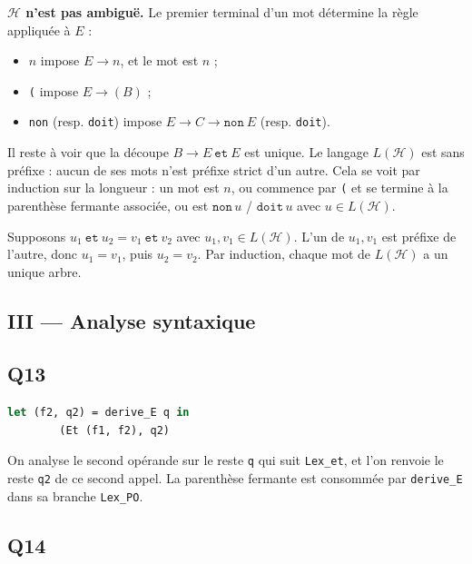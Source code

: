 \documentclass[11pt,a4paper]{article}
\providecommand{\tightlist}{\setlength{\itemsep}{0pt}\setlength{\parskip}{0pt}}
\begin{document}
\textbf{\(\mathcal H\) n'est pas ambiguë.} Le premier terminal d'un mot détermine la règle appliquée à \(E\) :

\begin{itemize}
\tightlist
\item
  \(n\) impose \(E\to n\), et le mot est \(n\) ;
\item
  \texttt{(} impose \(E\to(B)\) ;
\item
  \texttt{non} (resp. \texttt{doit}) impose \(E\to C\to\mathtt{non}\ E\) (resp. \texttt{doit}).
\end{itemize}

Il reste à voir que la découpe \(B\to E\ \mathtt{et}\ E\) est unique. Le langage \(L(\mathcal H)\) est sans préfixe : aucun de ses mots n'est préfixe strict d'un autre. Cela se voit par induction sur la longueur : un mot est \(n\), ou commence par \texttt{(} et se termine à la parenthèse fermante associée, ou est \(\mathtt{non}\,u\) / \(\mathtt{doit}\,u\) avec \(u\in L(\mathcal H)\).

Supposons \(u_1\ \mathtt{et}\ u_2 = v_1\ \mathtt{et}\ v_2\) avec \(u_1,v_1\in L(\mathcal H)\). L'un de \(u_1,v_1\) est préfixe de l'autre, donc \(u_1=v_1\), puis \(u_2=v_2\). Par induction, chaque mot de \(L(\mathcal H)\) a un unique arbre.

\hypertarget{iii-analyse-syntaxique}{%
\subsection{III --- Analyse syntaxique}\label{iii-analyse-syntaxique}}

\hypertarget{q13}{%
\subsection{Q13}\label{q13}}

\begin{lstlisting}[language=Caml]
        let (f2, q2) = derive_E q in
        (Et (f1, f2), q2)
\end{lstlisting}

On analyse le second opérande sur le reste \texttt{q} qui suit \texttt{Lex\_et}, et l'on renvoie le reste \texttt{q2} de ce second appel. La parenthèse fermante est consommée par \texttt{derive\_E} dans sa branche \texttt{Lex\_PO}.

\hypertarget{q14}{%
\subsection{Q14}\label{q14}}
\end{document}
